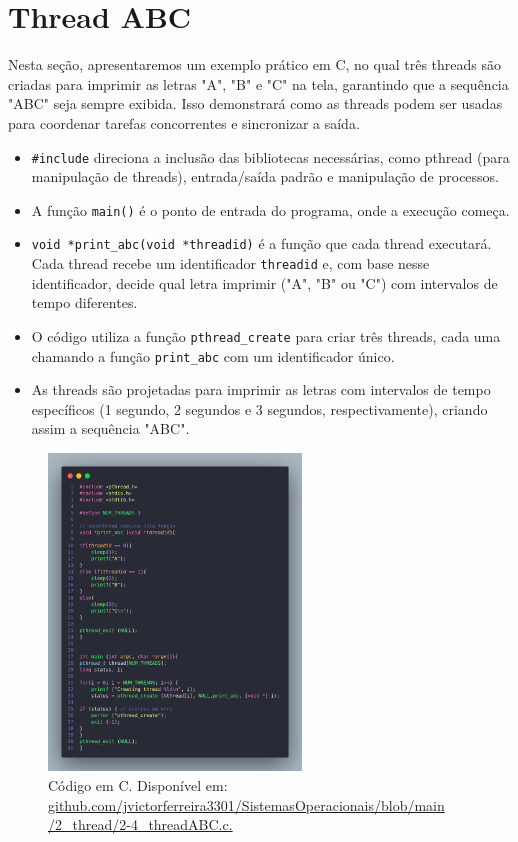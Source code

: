 \documentclass[
	12pt,				%
	openright,			%
	oneside,			%
	a4paper,			%
	chapter=TITLE,		%
	english,			%
	french,				%
	spanish,			%
	brazil				%
	]{abntex2}
\theoremstyle{definition}
\begin{document}
\section{Thread ABC}

Nesta seção, apresentaremos um exemplo prático em C, no qual três threads são 
criadas para imprimir as letras "A", "B" e "C" na tela, garantindo que 
a sequência "ABC" seja sempre exibida. Isso demonstrará como as threads 
podem ser usadas para coordenar tarefas concorrentes e sincronizar a saída.

\begin{itemize}
    
    \item \texttt{\#include} direciona a inclusão das bibliotecas necessárias, como pthread (para manipulação de threads), entrada/saída padrão e manipulação de processos.
    \item A função \texttt{main()} é o ponto de entrada do programa, onde a execução começa.
    \item \texttt{void *print\_abc(void *threadid)} é a função que cada thread executará. Cada thread recebe um identificador \texttt{threadid} e, com base nesse identificador, decide qual letra imprimir ("A", "B" ou "C") com intervalos de tempo diferentes.
    \item O código utiliza a função \texttt{pthread\_create} para criar três threads, cada uma chamando a função \texttt{print\_abc} com um identificador único.
    \item As threads são projetadas para imprimir as letras com intervalos de tempo específicos (1 segundo, 2 segundos e 3 segundos, respectivamente), criando assim a sequência "ABC".

\end{itemize}

\begin{figure}
    \centering
    \includegraphics[width=0.6\textwidth]{imagens/processos_4.png}
	\caption{Código em C. Disponível em: \href{https://github.com/jvictorferreira3301/Sistemas_Operacionais/blob/main/2_thread/2-4_threadABC.c}{github.com/jvictorferreira3301/SistemasOperacionais/blob/main
    /2\_thread/2-4\_threadABC.c.}}
	\label{fig:processos4}
\end{figure}
\end{document}
